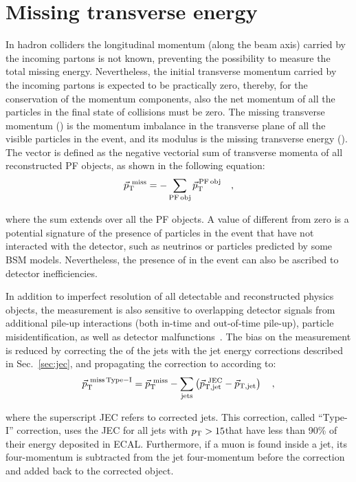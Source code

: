 \section{Missing transverse energy}\label{sec:met}

In hadron colliders the longitudinal momentum (along the beam axis) carried by the incoming partons is not known, preventing the possibility to measure the total missing energy. Nevertheless, the initial transverse momentum carried by the incoming partons is expected to be practically zero, thereby, for the conservation of the momentum components, also the net momentum of all the particles in the final state of collisions must be zero. The missing transverse momentum (\ptmiss) is the momentum imbalance in the transverse plane of all the visible particles in the event, and its modulus is the missing transverse energy (\MET). The \ptmiss vector is defined as the negative vectorial sum of transverse momenta of all reconstructed PF objects, as shown in the following equation:
\begin{equation}\label{eq:met}
\vec{p}_\mathrm{T}^\mathrm{~miss} = - \sum_{\mathrm{PF\,obj}} \vec{p}_\mathrm{T}^\mathrm{\,PF\,obj} \quad,
\end{equation}

\noindent where the sum extends over all the PF objects.
A value of \MET different from zero is a potential signature of the presence of particles in the event that have not interacted with the detector, such as neutrinos or particles predicted by some BSM models. Nevertheless, the presence of \MET in the event can also be ascribed to detector inefficiencies.

In addition to imperfect resolution of all detectable and reconstructed physics objects, the \MET measurement is also sensitive to overlapping detector signals from additional pile-up interactions (both in-time and out-of-time pile-up), particle misidentification, as well as detector  malfunctions~\cite{CMS-PAS-JME-12-002,CMS-PAS-JME-16-004}.
The bias on the \MET measurement is reduced by correcting the \pt of the jets with the jet energy corrections described in Sec.~\ref{sec:jec}, and propagating the correction to \MET according to:
\begin{equation}
\vec{p}_\mathrm{T}^\mathrm{~miss\,Type-I} = \vec{p}_\mathrm{T}^\mathrm{~miss} - \sum_\mathrm{jets} \left( \vec{p}_\mathrm{T,jet}^\mathrm{~JEC} - \vec{p}_\mathrm{T,jet}  \right) \quad ,
\end{equation}

\noindent where the superscript JEC refers to corrected jets. This correction, called ``Type-I'' correction, uses the JEC for all jets with $p_\mathrm{T}>15$\GeV that have less than 90\% of their energy deposited in ECAL. Furthermore, if a muon is found inside a jet, its four-momentum is subtracted from the jet four-momentum before the correction and added back to the corrected object.

